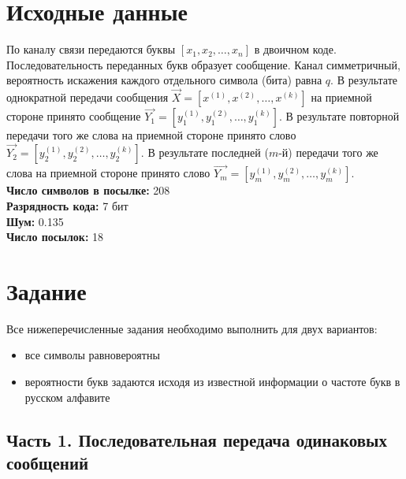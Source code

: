 






\tableofcontents
\newpage

\section{Исходные данные}

По каналу связи передаются буквы $[x_1, x_2,\dots, x_n]$ в двоичном коде. Последовательность переданных букв образует сообщение. Канал симметричный, вероятность искажения каждого отдельного символа (бита) равна $q$. В результате однократной передачи сообщения $\vec{X} = [x^{(1)}, x^{(2)},\dots, x^{(k)}]$ на приемной стороне принято сообщение $\vec{Y_1} = [y_1^{(1)}, y_1^{(2)},\dots, y_1^{(k)}]$. В результате повторной передачи того же слова на приемной стороне принято слово $\vec{Y_2} = [y_2^{(1)}, y_2^{(2)},\dots, y_2^{(k)}]$. В результате последней ($m$-й) передачи того же слова на приемной стороне принято слово $\vec{Y_m} = [y_m^{(1)}, y_m^{(2)},\dots, y_m^{(k)}]$.\\[5mm]

\noindent \textbf{Число символов в посылке:} 208\\
\textbf{Разрядность кода:} 7 бит\\
\textbf{Шум:} 0.135\\
\textbf{Число посылок:} 18\\

\section{Задание}

Все нижеперечисленные задания необходимо выполнить для двух вариантов:

\begin{itemize}
	\item все символы равновероятны
	\item вероятности букв задаются исходя из известной информации о частоте букв в русском алфавите
\end{itemize}

\subsection{Часть 1. Последовательная передача одинаковых сообщений}

